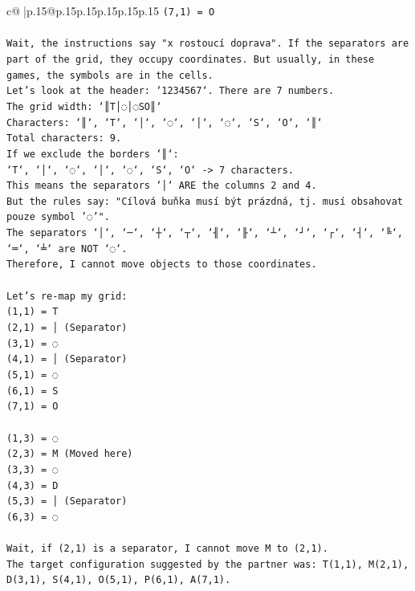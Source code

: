\documentclass{article}
\begin{document}
{\begin{supertabular}{c@{$\;$}|p{.15\linewidth}@{}p{.15\linewidth}p{.15\linewidth}p{.15\linewidth}p{.15\linewidth}p{.15\linewidth}}
{{{\texttt{(7,1) = O} \\
\\ 
\texttt{Wait, the instructions say "x rostoucí doprava". If the separators are part of the grid, they occupy coordinates. But usually, in these games, the symbols are in the cells.} \\
\texttt{Let's look at the header: `1234567`. There are 7 numbers.} \\
\texttt{The grid width: `║T│◌│◌SO║`} \\
\texttt{Characters: `║`, `T`, `│`, `◌`, `│`, `◌`, `S`, `O`, `║`} \\
\texttt{Total characters: 9.} \\
\texttt{If we exclude the borders `║`:} \\
\texttt{`T`, `│`, `◌`, `│`, `◌`, `S`, `O` {-}> 7 characters.} \\
\texttt{This means the separators `│` ARE the columns 2 and 4.} \\
\texttt{But the rules say: "Cílová buňka musí být prázdná, tj. musí obsahovat pouze symbol '◌'".} \\
\texttt{The separators `│`, `─`, `┼`, `┬`, `╢`, `╟`, `┴`, `┘`, `┌`, `┤`, `╚`, `═`, `╧` are NOT `◌`.} \\
\texttt{Therefore, I cannot move objects to those coordinates.} \\
\\ 
\texttt{Let's re{-}map my grid:} \\
\texttt{(1,1) = T} \\
\texttt{(2,1) = │ (Separator)} \\
\texttt{(3,1) = ◌} \\
\texttt{(4,1) = │ (Separator)} \\
\texttt{(5,1) = ◌} \\
\texttt{(6,1) = S} \\
\texttt{(7,1) = O} \\
\\ 
\texttt{(1,3) = ◌} \\
\texttt{(2,3) = M (Moved here)} \\
\texttt{(3,3) = ◌} \\
\texttt{(4,3) = D} \\
\texttt{(5,3) = │ (Separator)} \\
\texttt{(6,3) = ◌} \\
\\ 
\texttt{Wait, if (2,1) is a separator, I cannot move M to (2,1).} \\
\texttt{The target configuration suggested by the partner was: T(1,1), M(2,1), D(3,1), S(4,1), O(5,1), P(6,1), A(7,1).} \\
}}}
\end{supertabular}}
\end{document}
